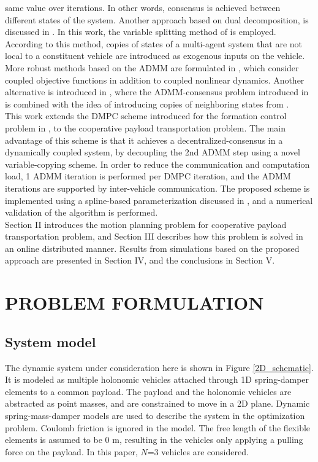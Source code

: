\documentclass[letterpaper, 10 pt, conference]{ieeeconf}
\begin{document}
 same value over iterations. In other words, consensus is achieved between different states of the system. Another approach based on dual decomposition, is discussed in \cite{c11}. In this work, the variable splitting method of \cite{c8} is employed. According to this method, copies of states of a multi-agent system that are not local to a constituent vehicle are introduced as exogenous inputs on the vehicle. More robust methods based on the ADMM are formulated in \cite{c12}, which consider coupled objective functions in addition to coupled nonlinear dynamics. Another alternative is introduced in \cite{c13}, where the
 ADMM-consensus problem introduced in \cite{c14} is combined with the idea of introducing copies of neighboring states from \cite{c11}.
 \\
 \indent
 This work extends the DMPC scheme introduced for the formation control problem in \cite{c16}, to the cooperative payload transportation problem. The main advantage of this scheme is that it achieves a decentralized-consensus in a dynamically coupled system, by decoupling the 2nd ADMM step using a novel variable-copying scheme. In order to reduce the communication and computation load, 1 ADMM iteration is performed per DMPC iteration, and the ADMM iterations are supported by inter-vehicle communication. The proposed scheme is implemented using a spline-based parameterization discussed in \cite{c16}, and a numerical validation of the algorithm is performed.
\\ \indent
Section  II  introduces  the  motion  planning  problem  for
cooperative payload transportation problem, and Section III describes how
this  problem is solved in an online distributed manner. Results from simulations based on the proposed approach are presented in Section IV, and the conclusions in Section V.
\section{PROBLEM FORMULATION}
\subsection{System model}
The dynamic system under consideration here is shown in Figure \ref{2D_schematic}. It is modeled as multiple holonomic vehicles attached through 1D spring-damper elements to a common payload. The payload and the holonomic vehicles are abstracted as point masses, and are constrained to move in a 2D plane. Dynamic spring-mass-damper models are used to describe the system in the optimization problem. Coulomb friction is ignored in the model. The free length of the flexible elements is assumed to be $0$ m, resulting in the vehicles only applying a pulling force on the payload. In this paper, $N$=3 vehicles are considered. 
\end{document}
